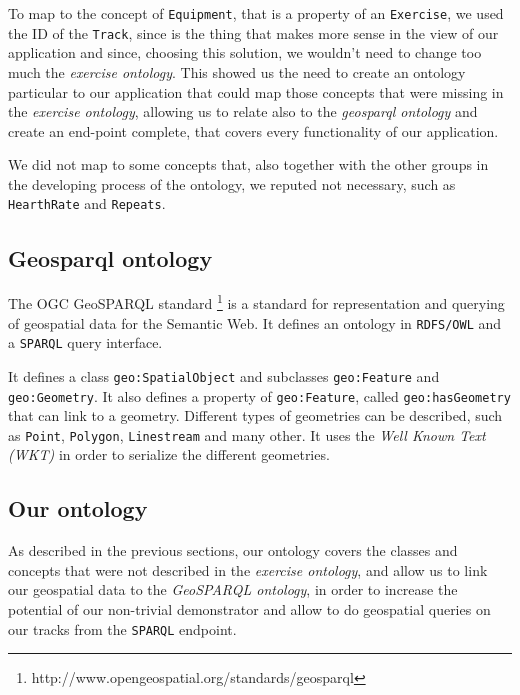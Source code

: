 \documentclass[11pt,a4paper]{article}
\begin{document}
To map to the concept of \texttt{Equipment}, that is a property of an \texttt{Exercise}, we used the ID of the \texttt{Track}, since is the thing that makes more sense in the view of our application and since, choosing this solution, we wouldn't need to change too much the \textit{exercise ontology}. 
This showed us the need to create an ontology particular to our application that could map those concepts that were missing in the \textit{exercise ontology}, allowing us to relate also to the \textit{geosparql ontology} and create an end-point complete, that covers every functionality of our application.

We did not map to some concepts that, also together with the other groups in the developing process of the ontology, we reputed not necessary, such as \texttt{HearthRate} and \texttt{Repeats}.
\subsection{Geosparql ontology}
The OGC GeoSPARQL standard \footnote{http://www.opengeospatial.org/standards/geosparql} is a standard for representation and querying of geospatial data for the Semantic Web. It defines an ontology in \texttt{RDFS/OWL} and a \texttt{SPARQL} query interface.

It defines a class \texttt{geo:SpatialObject} and subclasses \texttt{geo:Feature} and \texttt{geo:Geometry}. It also defines a property of \texttt{geo:Feature}, called \texttt{geo:hasGeometry} that can link to a geometry.
Different types of geometries can be described, such as \texttt{Point}, \texttt{Polygon}, \texttt{Linestream} and many other.
It uses the \textit{Well Known Text (WKT)} in order to serialize the different geometries.

\subsection{Our ontology}
As described in the previous sections, our ontology covers the classes and concepts that were not described in the \textit{exercise ontology}, and allow us to link our geospatial data to the \textit{GeoSPARQL ontology}, in order to increase the potential of our non-trivial demonstrator and allow to do geospatial queries on our tracks from the \texttt{SPARQL} endpoint.
\end{document}
